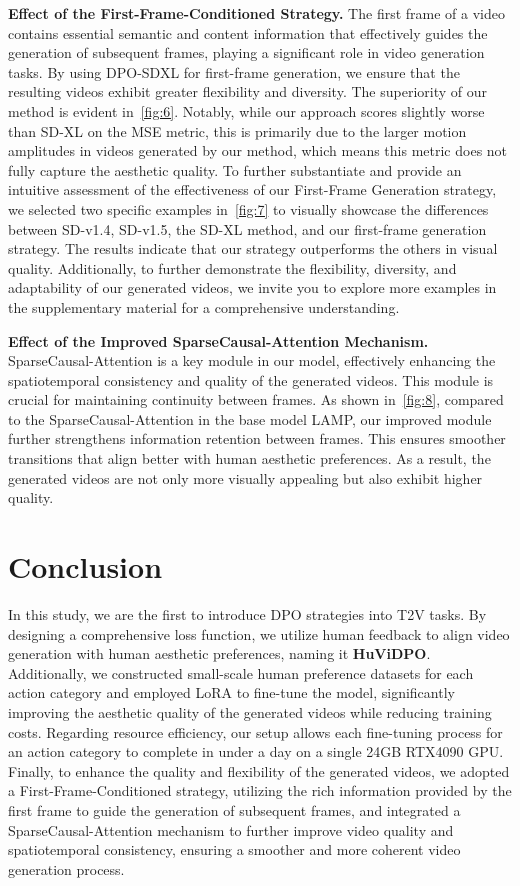 \noindent\textbf{Effect of the First-Frame-Conditioned Strategy.}
The first frame of a video contains essential semantic and content information that effectively guides the generation of subsequent frames, playing a significant role in video generation tasks. By using DPO-SDXL for first-frame generation, we ensure that the resulting videos exhibit greater flexibility and diversity. The superiority of our method is evident in~\cref{fig:6}. Notably, while our approach scores slightly worse than SD-XL on the MSE metric, this is primarily due to the larger motion amplitudes in videos generated by our method, which means this metric does not fully capture the aesthetic quality. To further substantiate and provide an intuitive assessment of the effectiveness of our First-Frame Generation strategy, we selected two specific examples in~\cref{fig:7} to visually showcase the differences between SD-v1.4, SD-v1.5, the SD-XL method, and our first-frame generation strategy. The results indicate that our strategy outperforms the others in visual quality. Additionally, to further demonstrate the flexibility, diversity, and adaptability of our generated videos, we invite you to explore more examples in the supplementary material for a comprehensive understanding.



\vspace{0.05cm}
\noindent\textbf{Effect of the Improved SparseCausal-Attention Mechanism.} 
SparseCausal-Attention is a key module in our model, effectively enhancing the spatiotemporal consistency and quality of the generated videos. This module is crucial for maintaining continuity between frames. As shown in~\cref{fig:8}, compared to the SparseCausal-Attention in the base model LAMP, our improved module further strengthens information retention between frames. This ensures smoother transitions that align better with human aesthetic preferences. As a result, the generated videos are not only more visually appealing but also exhibit higher quality.


\section{Conclusion}

In this study, we are the first to introduce DPO strategies into T2V tasks. By designing a comprehensive loss function, we utilize human feedback to align video generation with human aesthetic preferences, naming it \textbf{HuViDPO}. Additionally, we constructed small-scale human preference datasets for each action category and employed LoRA to fine-tune the model, significantly improving the aesthetic quality of the generated videos while reducing training costs. Regarding resource efficiency, our setup allows each fine-tuning process for an action category to complete in under a day on a single 24GB RTX4090 GPU. Finally, to enhance the quality and flexibility of the generated videos, we adopted a First-Frame-Conditioned strategy, utilizing the rich information provided by the first frame to guide the generation of subsequent frames, and integrated a SparseCausal-Attention mechanism to further improve video quality and spatiotemporal consistency, ensuring a smoother and more coherent video generation process.